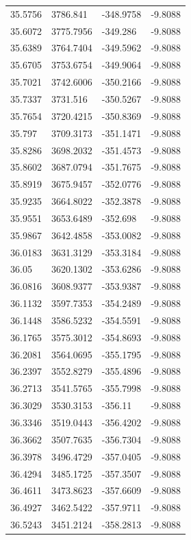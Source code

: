 \begin{table}[H]
\begin{tabular}{llll}
35.5756 & 3786.841 & -348.9758 & -9.8088 \\
35.6072 & 3775.7956 & -349.286 & -9.8088 \\
35.6389 & 3764.7404 & -349.5962 & -9.8088 \\
35.6705 & 3753.6754 & -349.9064 & -9.8088 \\
35.7021 & 3742.6006 & -350.2166 & -9.8088 \\
35.7337 & 3731.516 & -350.5267 & -9.8088 \\
35.7654 & 3720.4215 & -350.8369 & -9.8088 \\
35.797 & 3709.3173 & -351.1471 & -9.8088 \\
35.8286 & 3698.2032 & -351.4573 & -9.8088 \\
35.8602 & 3687.0794 & -351.7675 & -9.8088 \\
35.8919 & 3675.9457 & -352.0776 & -9.8088 \\
35.9235 & 3664.8022 & -352.3878 & -9.8088 \\
35.9551 & 3653.6489 & -352.698 & -9.8088 \\
35.9867 & 3642.4858 & -353.0082 & -9.8088 \\
36.0183 & 3631.3129 & -353.3184 & -9.8088 \\
36.05 & 3620.1302 & -353.6286 & -9.8088 \\
36.0816 & 3608.9377 & -353.9387 & -9.8088 \\
36.1132 & 3597.7353 & -354.2489 & -9.8088 \\
36.1448 & 3586.5232 & -354.5591 & -9.8088 \\
36.1765 & 3575.3012 & -354.8693 & -9.8088 \\
36.2081 & 3564.0695 & -355.1795 & -9.8088 \\
36.2397 & 3552.8279 & -355.4896 & -9.8088 \\
36.2713 & 3541.5765 & -355.7998 & -9.8088 \\
36.3029 & 3530.3153 & -356.11 & -9.8088 \\
36.3346 & 3519.0443 & -356.4202 & -9.8088 \\
36.3662 & 3507.7635 & -356.7304 & -9.8088 \\
36.3978 & 3496.4729 & -357.0405 & -9.8088 \\
36.4294 & 3485.1725 & -357.3507 & -9.8088 \\
36.4611 & 3473.8623 & -357.6609 & -9.8088 \\
36.4927 & 3462.5422 & -357.9711 & -9.8088 \\
36.5243 & 3451.2124 & -358.2813 & -9.8088 \\

\end{tabular}
\end{table}
